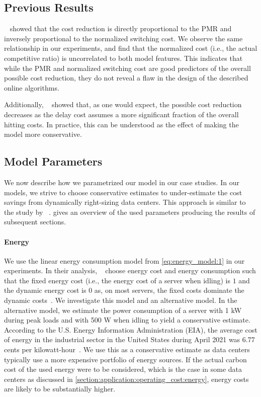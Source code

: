 \subsection{Previous Results}

\citeauthor*{Lin2011}~\cite{Lin2011} showed that the cost reduction is directly proportional to the PMR and inversely proportional to the normalized switching cost. We observe the same relationship in our experiments, and find that the normalized cost (i.e., the actual competitive ratio) is uncorrelated to both model features. This indicates that while the PMR and normalized switching cost are good predictors of the overall possible cost reduction, they do not reveal a flaw in the design of the described online algorithms.

Additionally, \citeauthor*{Lin2011}~\cite{Lin2011} showed that, as one would expect, the possible cost reduction decreases as the delay cost assumes a more significant fraction of the overall hitting costs. In practice, this can be understood as the effect of making the model more conservative.

\subsection{Model Parameters}

We now describe how we parametrized our model in our case studies. In our models, we strive to choose conservative estimates to under-estimate the cost savings from dynamically right-sizing data centers. This approach is similar to the study by \citeauthor*{Lin2011}~\cite{Lin2011}.  gives an overview of the used parameters producing the results of subsequent sections.

\paragraph{Energy} We use the linear energy consumption model from \autoref{eq:energy_model:1} in our experiments. In their analysis, \citeauthor*{Lin2011}~\cite{Lin2011} choose energy cost and energy consumption such that the fixed energy cost (i.e., the energy cost of a server when idling) is $1$ and the dynamic energy cost is $0$ as, on most servers, the fixed costs dominate the dynamic costs~\cite{Clark2005}. We investigate this model and an alternative model. In the alternative model, we estimate the power consumption of a server with 1 kW during peak loads and with 500 W when idling to yield a conservative estimate. According to the U.S. Energy Information Administration (EIA), the average cost of energy in the industrial sector in the United States during April 2021 was 6.77 cents per kilowatt-hour~\cite{EIA2021}. We use this as a conservative estimate as data centers typically use a more expensive portfolio of energy sources. If the actual carbon cost of the used energy were to be considered, which is the case in some data centers as discussed in \cref{section:application:operating_cost:energy}, energy costs are likely to be substantially higher.

